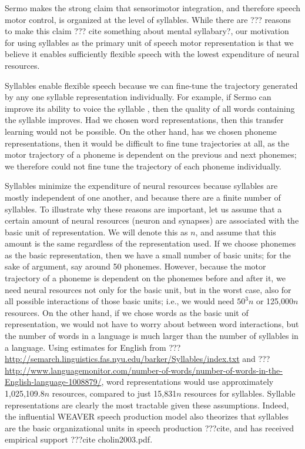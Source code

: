 Sermo makes the strong claim
that sensorimotor integration,
and therefore speech motor control,
is organized at the level of syllables.
While there are ??? reasons
to make this claim
??? cite something about mental syllabary?,
our motivation for using syllables
as the primary unit
of speech motor representation
is that we believe
it enables sufficiently flexible speech
with the lowest expenditure of neural resources.

Syllables enable flexible speech
because we can fine-tune the
trajectory generated by any
one syllable representation individually.
For example,
if Sermo can improve its ability
to voice the syllable \ipa{[bA]},
then the quality of all words
containing the syllable \ipa{[bA]}
improves.
Had we chosen word representations,
then this transfer learning
would not be possible.
On the other hand,
has we chosen phoneme representations,
then it would be difficult
to fine tune trajectories at all,
as the motor trajectory of a phoneme
is dependent on the
previous and next phonemes;
we therefore could not fine tune
the trajectory of each phoneme individually.

Syllables minimize the expenditure of neural resources
because syllables are mostly independent of one another,
and because there are a finite number of syllables.
To illustrate why these reasons are important,
let us assume that a certain amount of
neural resources (neuron and synapses)
are associated with the basic unit of representation.
We will denote this as $n$,
and assume that this amount is the same
regardless of the representation used.
If we choose phonemes as the basic representation,
then we have a small number of basic units;
for the sake of argument,
say around 50 phonemes.
However, because the motor trajectory
of a phoneme is dependent on the
phonemes before and after it,
we need neural resources not only for
the basic unit, but in the worst case,
also for all possible
interactions of those basic units;
i.e., we would need $50^3n$ or 125,000$n$ resources.
On the other hand, if we chose
words as the basic unit of representation,
we would not have to worry about
between word interactions,
but the number of words in a language
is much larger than the number of syllables
in a language.
Using estimates for English
from ??? \url{http://semarch.linguistics.fas.nyu.edu/barker/Syllables/index.txt}
and ??? \url{http://www.languagemonitor.com/number-of-words/number-of-words-in-the-English-language-1008879/},
word representations would use approximately
1,025,109.8$n$ resources,
compared to just 15,831$n$ resources for syllables.
Syllable representations are clearly the most tractable
given these assumptions.
Indeed, the influential WEAVER speech production model
also theorizes that syllables
are the basic organizational units
in speech production ???cite,
and has received empirical support
???cite cholin2003.pdf.

